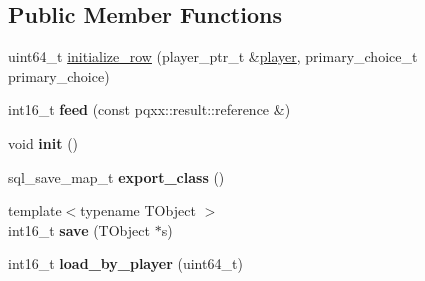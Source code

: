 \subsection*{Public Member Functions}
\begin{DoxyCompactItemize}
\item 
uint64\+\_\+t \hyperlink{structmods_1_1orm_1_1sentinel_aa01c7770d384a6461a7d886e1ac94d03}{initialize\+\_\+row} (player\+\_\+ptr\+\_\+t \&\hyperlink{classmods_1_1player}{player}, primary\+\_\+choice\+\_\+t primary\+\_\+choice)
\item 
\mbox{\label{structmods_1_1orm_1_1sentinel_a5ecb7826ac778ce46553d5e2ddc1e1ce}} 
int16\+\_\+t {\bfseries feed} (const pqxx\+::result\+::reference \&)
\item 
\mbox{\label{structmods_1_1orm_1_1sentinel_a647d47550ba7a701db859ae345ed4961}} 
void {\bfseries init} ()
\item 
\mbox{\label{structmods_1_1orm_1_1sentinel_a92fab6f75026a8f32d4e247fdb354fe1}} 
sql\+\_\+save\+\_\+map\+\_\+t {\bfseries export\+\_\+class} ()
\item 
\mbox{\label{structmods_1_1orm_1_1sentinel_a489399f341134b33a89e641824852de7}} 
{\footnotesize template$<$typename T\+Object $>$ }\\int16\+\_\+t {\bfseries save} (T\+Object $\ast$s)
\item 
\mbox{\label{structmods_1_1orm_1_1sentinel_ae6255e3f50d7301ccc28fd42c4821e45}} 
int16\+\_\+t {\bfseries load\+\_\+by\+\_\+player} (uint64\+\_\+t)
\end{DoxyCompactItemize}

